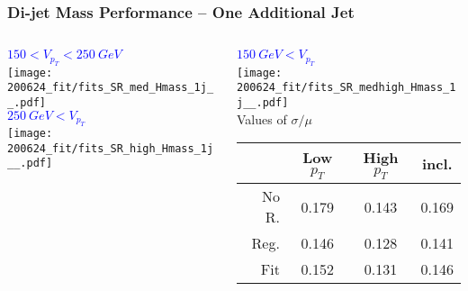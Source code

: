 \documentclass{beamer}
\begin{document}
\begin{frame}
  \frametitle{Di-jet Mass Performance -- One Additional Jet}

  \begin{columns}
    \begin{column}{0.5\linewidth}
      \centering
      \textcolor{blue}{$150 < V_{p_T} < \SI{250}{GeV}$} \\
      \texttt{[image: 200624\_fit/fits\_SR\_med\_Hmass\_1j\_\_.pdf]} \\
      \textcolor{blue}{$\SI{250}{GeV} < V_{p_T}$} \\
      \texttt{[image: 200624\_fit/fits\_SR\_high\_Hmass\_1j\_\_.pdf]}
    \end{column}
    \begin{column}{0.5\linewidth}
      \centering
      \textcolor{blue}{$\SI{150}{GeV} < V_{p_T}$} \\
      \texttt{[image: 200624\_fit/fits\_SR\_medhigh\_Hmass\_1j\_\_.pdf]} \\

      Values of $\sigma/\mu$
      {\scriptsize
      \begin{tabular}{|r|c|c|c|}
        \hline
        & Low $p_T$ & High $p_T$ & incl. \\
        \hline
        No R. & 0.179 & 0.143 & 0.169 \\
        Reg.  & 0.146 & 0.128 & 0.141 \\
        Fit   & 0.152 & 0.131 & 0.146 \\
        \hline
      \end{tabular}
      }
    \end{column}
  \end{columns}

\end{frame}
\end{document}
